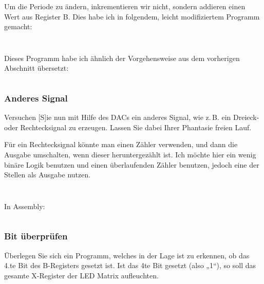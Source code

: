 Um die Periode zu ändern, inkrementieren wir nicht, sondern addieren einen Wert
aus Register B. Dies habe ich in folgendem, leicht modifiziertem Programm
gemacht:

\inputminted[fontsize=\small, linenos]{cpp}{../Prototypen/d.cpp}

\begin{multicols}{9}
	\inputminted[fontsize=\footnotesize]{text}{d.txt}
\end{multicols}

Dieses Programm habe ich ähnlich der Vorgehensweise aus dem vorherigen
Abschnitt übersetzt:

\inputminted[fontsize=\small, linenos]{python}{../Assembly/d.s}

\subsubsection{Anderes Signal}

\begin{problem}
	Versuchen [S]ie nun mit Hilfe des DACs ein anderes Signal, wie z.\,B. ein
	Dreieck- oder Rechtecksignal zu erzeugen. Lassen Sie dabei Ihrer Phantasie
	freien Lauf.
\end{problem}

Für ein Rechtecksignal könnte man einen Zähler verwenden, und dann die Ausgabe
umschalten, wenn dieser heruntergezählt ist. Ich möchte hier ein wenig binäre
Logik benutzen und einen überlaufenden Zähler benutzen, jedoch eine der Stellen
als Ausgabe nutzen.

\inputminted[fontsize=\small, linenos]{cpp}{../Prototypen/e.cpp}

\begin{multicols}{9}
	\inputminted[fontsize=\footnotesize]{text}{e.txt}
\end{multicols}

In Assembly:

\inputminted[fontsize=\small, linenos]{python}{../Assembly/e.s}

\subsubsection{Bit überprüfen}

\begin{problem}
	Überlegen Sie sich ein Programm, welches in der Lage ist zu erkennen, ob
	das 4.te Bit des B-Registers gesetzt ist. Ist das 4te Bit gesetzt (also
	„1“), so soll das gesamte X-Register der LED Matrix aufleuchten.
\end{problem}

